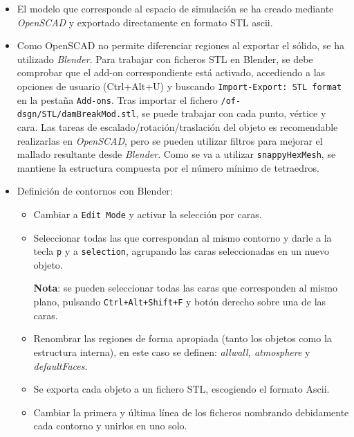 \begin{itemize}
  \begin{itemize}
  \item
    El modelo que corresponde al espacio de simulación se ha creado
    mediante \emph{OpenSCAD} y exportado directamente en formato STL
    ascii.
  \item
    Como OpenSCAD no permite diferenciar regiones al exportar el sólido,
    se ha utilizado \emph{Blender}. Para trabajar con ficheros STL en
    Blender, se debe comprobar que el add-on correspondiente está
    activado, accediendo a las opciones de usuario (Ctrl+Alt+U) y
    buscando \texttt{Import-Export:\ STL\ format} en la pestaña
    \texttt{Add-ons}. Tras importar el fichero
    \texttt{/of-dsgn/STL/damBreakMod.stl}, se puede trabajar con cada
    punto, vértice y cara. Las tareas de escalado/rotación/traslación
    del objeto es recomendable realizarlas en \emph{OpenSCAD}, pero se
    pueden utilizar filtros para mejorar el mallado resultante desde
    \emph{Blender}. Como se va a utilizar \texttt{snappyHexMesh}, se
    mantiene la estructura compuesta por el número mínimo de tetraedros.
  \end{itemize}
\end{itemize}

\begin{itemize}
\item
  Definición de contornos con Blender:

  \begin{itemize}
  \item
    Cambiar a \texttt{Edit\ Mode} y activar la selección por caras.
  \item
    Seleccionar todas las que correspondan al mismo contorno y darle a
    la tecla \texttt{p} y a \texttt{selection}, agrupando las caras
    seleccionadas en un nuevo objeto.

    \textbf{Nota}: se pueden seleccionar todas las caras que
    corresponden al mismo plano, pulsando \texttt{Ctrl+Alt+Shift+F} y
    botón derecho sobre una de las caras.
  \item
    Renombrar las regiones de forma apropiada (tanto los objetos como la
    estructura interna), en este caso se definen: \emph{allwall,
    atmosphere} y \emph{defaultFaces}.
  \item
    Se exporta cada objeto a un fichero STL, escogiendo el formato
    Ascii.
  \item
    Cambiar la primera y última línea de los ficheros nombrando
    debidamente cada contorno y unirlos en uno solo.
  \end{itemize}
\end{itemize}

